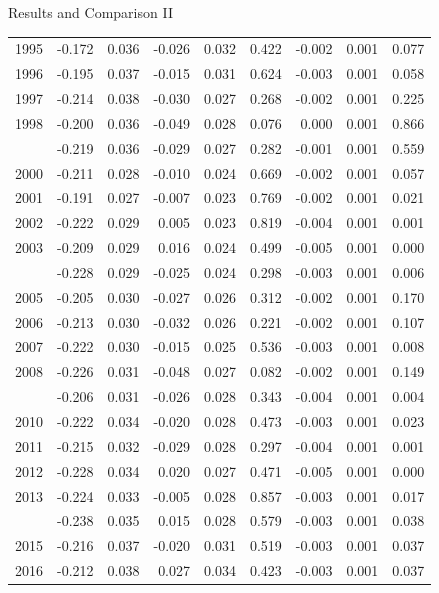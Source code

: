 \documentclass[10pt,ignorenonframetext,]{beamer}
\begin{document}
\begin{frame}{Results and Comparison II}
\begin{longtable}{rrrrrrrrr}
1995 & -0.172 & 0.036 & -0.026 & 0.032 & 0.422 & -0.002 & 0.001 & 0.077\\
1996 & -0.195 & 0.037 & -0.015 & 0.031 & 0.624 & -0.003 & 0.001 & 0.058\\
1997 & -0.214 & 0.038 & -0.030 & 0.027 & 0.268 & -0.002 & 0.001 & 0.225\\
1998 & -0.200 & 0.036 & -0.049 & 0.028 & 0.076 & 0.000 & 0.001 & 0.866\\
\addlinespace
1999 & -0.219 & 0.036 & -0.029 & 0.027 & 0.282 & -0.001 & 0.001 & 0.559\\
2000 & -0.211 & 0.028 & -0.010 & 0.024 & 0.669 & -0.002 & 0.001 & 0.057\\
2001 & -0.191 & 0.027 & -0.007 & 0.023 & 0.769 & -0.002 & 0.001 & 0.021\\
2002 & -0.222 & 0.029 & 0.005 & 0.023 & 0.819 & -0.004 & 0.001 & 0.001\\
2003 & -0.209 & 0.029 & 0.016 & 0.024 & 0.499 & -0.005 & 0.001 & 0.000\\
\addlinespace
2004 & -0.228 & 0.029 & -0.025 & 0.024 & 0.298 & -0.003 & 0.001 & 0.006\\
2005 & -0.205 & 0.030 & -0.027 & 0.026 & 0.312 & -0.002 & 0.001 & 0.170\\
2006 & -0.213 & 0.030 & -0.032 & 0.026 & 0.221 & -0.002 & 0.001 & 0.107\\
2007 & -0.222 & 0.030 & -0.015 & 0.025 & 0.536 & -0.003 & 0.001 & 0.008\\
2008 & -0.226 & 0.031 & -0.048 & 0.027 & 0.082 & -0.002 & 0.001 & 0.149\\
\addlinespace
2009 & -0.206 & 0.031 & -0.026 & 0.028 & 0.343 & -0.004 & 0.001 & 0.004\\
2010 & -0.222 & 0.034 & -0.020 & 0.028 & 0.473 & -0.003 & 0.001 & 0.023\\
2011 & -0.215 & 0.032 & -0.029 & 0.028 & 0.297 & -0.004 & 0.001 & 0.001\\
2012 & -0.228 & 0.034 & 0.020 & 0.027 & 0.471 & -0.005 & 0.001 & 0.000\\
2013 & -0.224 & 0.033 & -0.005 & 0.028 & 0.857 & -0.003 & 0.001 & 0.017\\
\addlinespace
2014 & -0.238 & 0.035 & 0.015 & 0.028 & 0.579 & -0.003 & 0.001 & 0.038\\
2015 & -0.216 & 0.037 & -0.020 & 0.031 & 0.519 & -0.003 & 0.001 & 0.037\\
2016 & -0.212 & 0.038 & 0.027 & 0.034 & 0.423 & -0.003 & 0.001 & 0.037\\*
\end{longtable}\endgroup{}


\end{frame}
\end{document}

